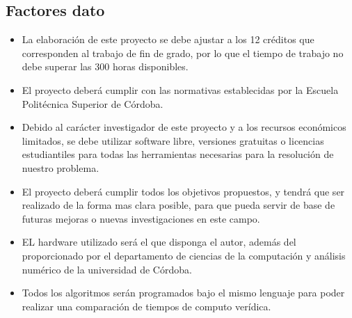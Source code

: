 \documentclass[a4paper, 12pt]{book}
\begin{document}
\subsection{Factores dato}
\begin{itemize}

\item  La elaboración de este proyecto se debe ajustar a los 12 créditos que corresponden al trabajo de fin de grado, por lo que el tiempo de trabajo no debe superar las 300 horas disponibles.

\item El proyecto deberá cumplir con las normativas establecidas por la Escuela Politécnica Superior de Córdoba.

\item Debido al carácter investigador de este proyecto y a los recursos económicos limitados, se debe utilizar software libre, versiones gratuitas o licencias estudiantiles para todas las herramientas necesarias para la resolución de nuestro problema.

\item El proyecto deberá cumplir todos los objetivos propuestos, y tendrá que ser realizado de la forma mas clara posible, para que pueda servir de base de futuras mejoras o nuevas investigaciones en este campo.

\item EL hardware utilizado será el que disponga el autor, además del proporcionado por el departamento de ciencias de la computación y análisis numérico de la universidad de Córdoba.

\item Todos los algoritmos serán programados bajo el mismo lenguaje para poder realizar una comparación de tiempos de computo verídica.

\end{itemize}

\newpage
\end{document}
